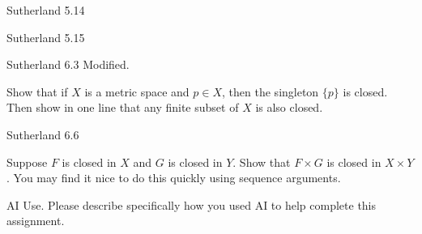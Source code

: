\documentclass[minion]{homework}
\begin{document}
\begin{problems}

\problem Sutherland 5.14

\problem Sutherland 5.15

\problem Sutherland 6.3 Modified.

Show that if $X$ is a metric space and $p\in X$, then the singleton $\{p\}$ is closed.
Then show in one line that any finite subset of $X$ is also closed.

\problem Sutherland 6.6

\problem Suppose $F$ is closed in $X$ and $G$ is closed in $Y$.  Show 
that $F\times G$ is closed in $X \times Y$.  You may find it nice to
do this quickly using sequence arguments.

\problem AI Use. Please describe specifically how you used AI to help complete this assignment.

\end{problems}
\end{document}
